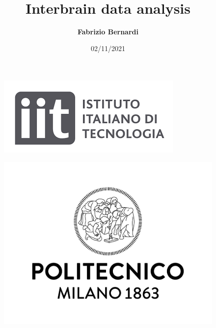 \documentclass{beamer}
\title{Interbrain data analysis}
\author[F. Bernardi]{\textbf{Fabrizio Bernardi}} \medskip
\date[02/11/2021]{02/11/2021}
\begin{document}
	
	
		\begin{frame}
	\maketitle
	
	\begin{minipage}{\linewidth}
		\centering
		\begin{minipage}{0.45\linewidth}
			\begin{figure}[H]
				\includegraphics[width=\linewidth]{Logo_IIT.png}
				
			\end{figure}
		\end{minipage}
		\hspace{0.05\linewidth}
		\begin{minipage}{0.45\linewidth}
			\begin{figure}[H]
				\includegraphics[width=\linewidth]{Logo_Politecnico_Milano.jpg}
				
			\end{figure}
		\end{minipage}
	\end{minipage}
\end{frame}
\end{document}
